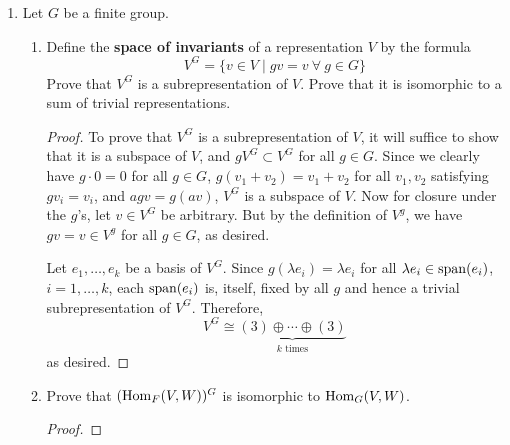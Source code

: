 \documentclass[../psets.tex]{subfiles}
\begin{document}
\begin{enumerate}
\begin{proof}
    \end{proof}
    \item Let $G$ be a finite group.
    \begin{enumerate}
        \item Define the \textbf{space of invariants} of a representation $V$ by the formula
        \begin{equation*}
            V^G = \{v\in V\mid gv=v\ \forall\ g\in G\}
        \end{equation*}
        Prove that $V^G$ is a subrepresentation of $V$. Prove that it is isomorphic to a sum of trivial representations.
        \begin{proof}
            To prove that $V^G$ is a subrepresentation of $V$, it will suffice to show that it is a subspace of $V$, and $gV^G\subset V^G$ for all $g\in G$. Since we clearly have $g\cdot 0=0$ for all $g\in G$, $g(v_1+v_2)=v_1+v_2$ for all $v_1,v_2$ satisfying $gv_i=v_i$, and $agv=g(av)$, $V^G$ is a subspace of $V$. Now for closure under the $g$'s, let $v\in V^G$ be arbitrary. But by the definition of $V^g$, we have $gv=v\in V^g$ for all $g\in G$, as desired.\par
            Let $e_1,\dots,e_k$ be a basis of $V^G$. Since $g(\lambda e_i)=\lambda e_i$ for all $\lambda e_i\in\operatorname{span}(e_i)$, $i=1,\dots,k$, each $\operatorname{span}(e_i)$ is, itself, fixed by all $g$ and hence a trivial subrepresentation of $V^G$. Therefore,
            \begin{equation*}
                V^G \cong \underbrace{(3)\oplus\cdots\oplus(3)}_{k\text{ times}}
            \end{equation*}
            as desired.
        \end{proof}
        \item Prove that $(\operatorname{Hom}_F(V,W))^G$ is isomorphic to $\operatorname{Hom}_G(V,W)$.
        \begin{proof}




\end{proof}
\end{enumerate}
\end{enumerate}
\end{document}
